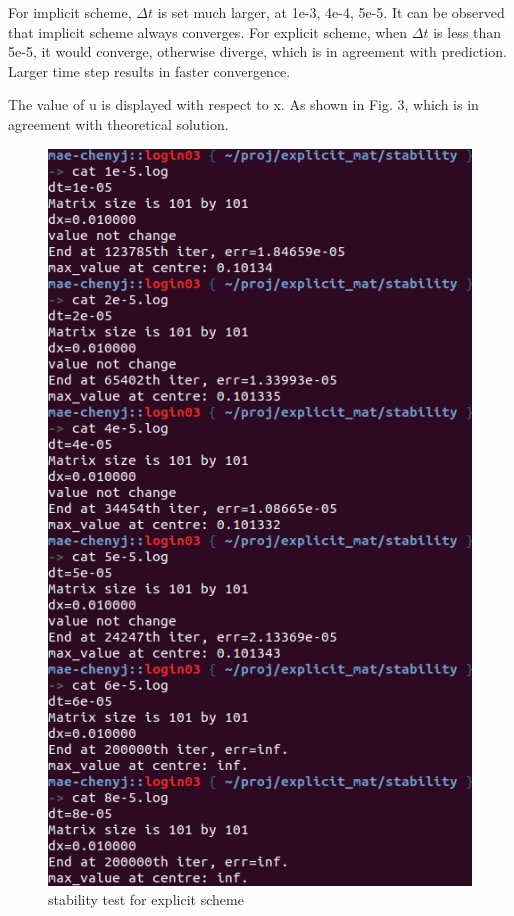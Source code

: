 \documentclass[a4paper,10pt]{article}
\begin{document}
For implicit scheme, $\Delta t$ is set much larger, at 1e-3, 4e-4, 5e-5. It can be observed that implicit scheme always converges. For explicit scheme, when $\Delta t$ is less than 5e-5, it would converge, otherwise diverge, which is in agreement with prediction. Larger time step results in faster convergence.

The value of u is displayed with respect to x. As shown in Fig. 3, which is in agreement with theoretical solution.


\begin{figure}[h]
	\centering
	\includegraphics[scale=0.8]{explicit_stability.jpg}
	\caption{stability test for explicit scheme}
\end{figure}
\end{document}
